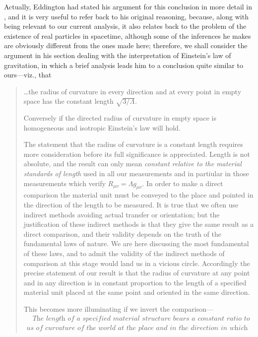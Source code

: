 Actually, Eddington had stated his argument for this conclusion in more detail in \cite{Eddington1923}, and it is very useful to refer back to his original reasoning, because, along with being relevant to our current analysis, it also relates back to the problem of the existence of real particles in spacetime, although some of the inferences he makes are obviously different from the ones made here; therefore, we shall consider the argument in his section dealing with the interpretation of Einstein's law of gravitation, in which a brief analysis leads him to a conclusion quite similar to ours---viz., that
\begin{quotation} 
\ldots the radius of curvature in every direction and at every point in empty space has the constant length $\sqrt{3/\Lambda}$.

Conversely if the directed radius of curvature in empty space is homogeneous and isotropic Einstein's law will hold.

The statement that the radius of curvature is a constant length requires more consideration before its full significance is appreciated. Length is not absolute, and the result can only mean \textit{constant relative to the material standards of length} used in all our measurements and in partiular in those measurements which verify $R_{\mu\nu}={\Lambda}g_{\mu\nu}$. In order to make a direct comparison the material unit must be conveyed to the place and pointed in the direction of the length to be measured. It is true that we often use indirect methods avoiding actual transfer or orientation; but the justification of these indirect methods is that they give the same result as a direct comparison, and their validity depends on the truth of the fundamental laws of nature. We are here discussing the most fundamental of these laws, and to admit the validity of the indirect methods of comparison at this stage would land us in a vicious circle. Accordingly the precise statement of our result is that the radius of curvature at any point and in any direction is in constant proportion to the length of a specified material unit placed at the same point and oriented in the same direction.

This becomes more illuminating if we invert the comparison---
\begin{eqnarray}
~~~~\nonumber{\textit{The length of a specified material structure bears a constant ratio to the radi-}}\\
\textit{us of curvature of the world at the place and in the direction in which it lies.~~~~~}\label{Edd_law}
\end{eqnarray}


\end{quotation}
